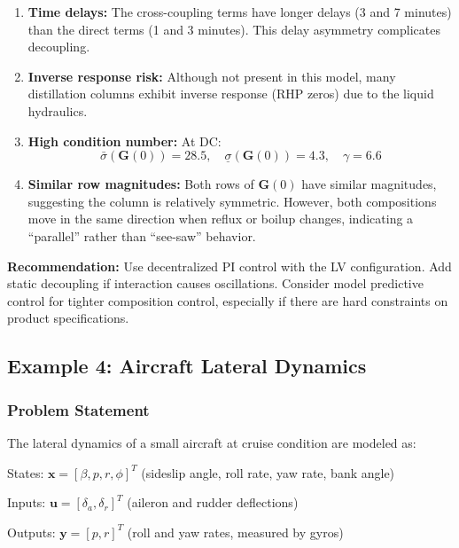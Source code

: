 \begin{enumerate}
\item \textbf{Time delays:} The cross-coupling terms have longer delays (3 and 7 minutes) than the direct terms (1 and 3 minutes). This delay asymmetry complicates decoupling.

\item \textbf{Inverse response risk:} Although not present in this model, many distillation columns exhibit inverse response (RHP zeros) due to the liquid hydraulics.

\item \textbf{High condition number:} At DC:
\begin{equation}
\bar{\sigma}(\mathbf{G}(0)) = 28.5, \quad \underline{\sigma}(\mathbf{G}(0)) = 4.3, \quad \gamma = 6.6
\end{equation}

\item \textbf{Similar row magnitudes:} Both rows of $\mathbf{G}(0)$ have similar magnitudes, suggesting the column is relatively symmetric. However, both compositions move in the same direction when reflux or boilup changes, indicating a ``parallel'' rather than ``see-saw'' behavior.
\end{enumerate}

\textbf{Recommendation:} Use decentralized PI control with the LV configuration. Add static decoupling if interaction causes oscillations. Consider model predictive control for tighter composition control, especially if there are hard constraints on product specifications.


\subsection{Example 4: Aircraft Lateral Dynamics}

\subsubsection{Problem Statement}

The lateral dynamics of a small aircraft at cruise condition are modeled as:

States: $\mathbf{x} = [\beta, p, r, \phi]^T$ (sideslip angle, roll rate, yaw rate, bank angle)

Inputs: $\mathbf{u} = [\delta_a, \delta_r]^T$ (aileron and rudder deflections)

Outputs: $\mathbf{y} = [p, r]^T$ (roll and yaw rates, measured by gyros)


